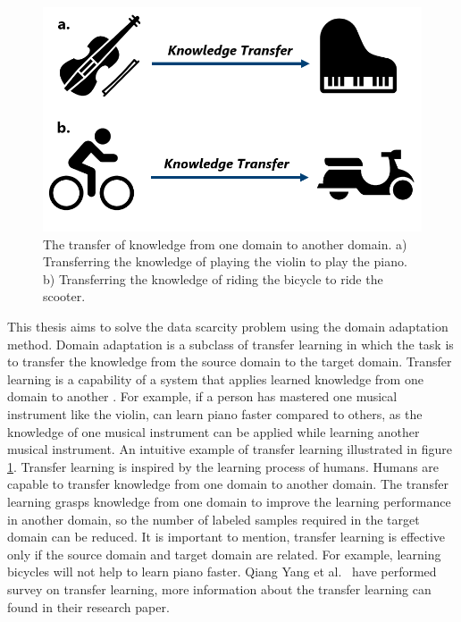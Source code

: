 \begin{figure}[H]
        \begin{center}
 	    \includegraphics[scale=0.40]{images/Introduction/TransferLearning.png}
	    \caption[The transfer of knowledge from one domain to another domain.]{The transfer of knowledge from one domain to another domain. a) Transferring the knowledge of playing the violin to play the piano. b) Transferring the knowledge of riding the bicycle to ride the scooter.}
	    \label{fig:TransferLearning}
	    \end{center}
\end{figure}

This thesis aims to solve the data scarcity problem using the domain adaptation method. Domain adaptation is a subclass of transfer learning in which the task is to transfer the knowledge from the source domain to the target domain. Transfer learning is a capability of a system that applies learned knowledge from one domain to another \cite{zhuang2020comprehensive}. For example, if a person has mastered one musical instrument like the violin, can learn piano faster compared to others, as the knowledge of one musical instrument can be applied while learning another musical instrument. An intuitive example of transfer learning illustrated in figure \ref{fig:TransferLearning}. Transfer learning is inspired by the learning process of humans. Humans are capable to transfer knowledge from one domain to another domain. The transfer learning grasps knowledge from one domain to improve the learning performance in another domain, so the number of labeled samples required in the target domain can be reduced. It is important to mention, transfer learning is effective only if the source domain and target domain are related. For example, learning bicycles will not help to learn piano faster. Qiang Yang et al.\ \cite{5288526} have performed survey on transfer learning, more information about the transfer learning can found in their research paper.  




